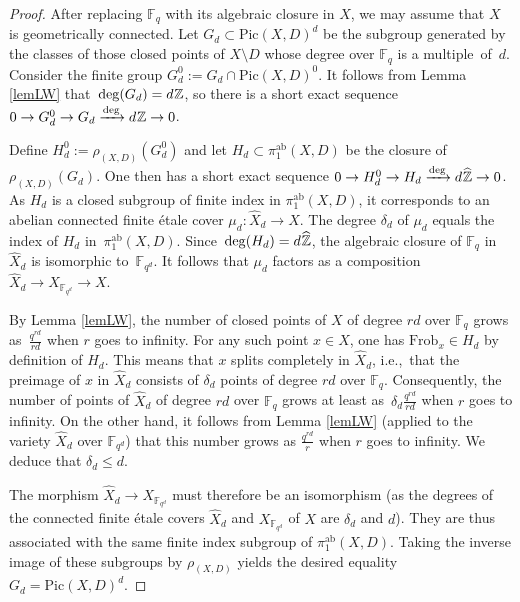 \documentclass[10pt,a4paper]{amsart}
\newcommand{\ie}{i.e.\ }
\def\F{\mathbb F}
\def\Z{\mathbb Z}
\def\ie{i.e.,\ }
\def\whX{\widehat{X}}
\newcommand{\Frob}{\mathrm{Frob}}
\newcommand{\Pic}{\mathrm{Pic}}
\newcommand{\ab}{\mathrm{ab}}
\begin{document}
\begin{proof}
After replacing $\F_q$ with its algebraic closure in $X$, we may assume that $X$ is geometrically connected. Let $G_d\subset \Pic(X,D)^d$ be the subgroup generated by 
the classes of those closed points of $X\setminus D$ whose degree over $\F_q$ is a multiple~of~$d$.
Consider the finite group $G_d^0:=G_d\cap\Pic(X,D)^0$. It follows from Lemma \ref{lemLW} that~$\deg(G_d)=d\mkern 1mu\Z$, so there is a short exact sequence $0\to G_d^0\to G_d\xrightarrow{\deg}d\mkern 1mu\Z\to 0$.

Define $H_d^0:=\rho_{(X,D)}(G_d^0)$ and let $H_d\subset \pi_1^{\ab}(X,D)$ be the closure of $\rho_{(X,D)}(G_d)$. One then has a short exact sequence $0\to H_d^0\to H_d\xrightarrow{\deg}d\mkern 1mu\widehat{\Z}\to 0$. As $H_d$ is a closed subgroup of finite index in $\pi_1^{\ab}(X,D)$, it corresponds to an abelian connected finite \'etale cover $\mu_d:\whX_d\to X$. The degree $\delta_d$ of $\mu_d$ equals the index of $H_d$ in~$\pi_1^{\ab}(X,D)$. Since~$\deg(H_d)=d\mkern 1mu\widehat{\Z}$, the algebraic closure of $\F_q$ in $\whX_d$ is isomorphic to~$\F_{q^d}$.
It follows that $\mu_d$ factors as a composition $\whX_d\to X_{\F_{q^d}}\to X$.

By Lemma \ref{lemLW}, the number of closed points of $X$ of degree $rd$ over $\F_q$ grows as~$\frac{q^{rd}}{rd}$ when $r$ goes to infinity. For any such point $x\in X$, one has $\Frob_x\in H_d$ by definition of $H_d$. This means that $x$ splits completely in $\whX_d$, \ie that the preimage of $x$ in $\whX_d$ consists of $\delta_d$ points of degree $rd$ over $\F_q$. Consequently, the number of points of $\whX_d$ of degree $rd$ over $\F_q$ grows at least as~$\delta_d\frac{q^{rd}}{rd}$ when $r$ goes to infinity. On the other hand, it follows from Lemma \ref{lemLW} (applied to the variety $\whX_d$ over $\F_{q^d}$) that this number grows as $\frac{q^{rd}}{r}$ when $r$ goes to infinity. We deduce that $\delta_d\leq d$.

The morphism $\whX_d\to X_{\F_{q^d}}$
must therefore be an isomorphism (as the degrees of the connected finite \'etale covers 
$\whX_d$ and $X_{\F_{q^d}}$ of $X$ 
are $\delta_d$ and $d$). They are thus associated with the same finite index subgroup of $\pi_1^{\ab}(X,D)$. Taking the inverse image of these subgroups by $\rho_{(X,D)}$ yields the desired equality $G_d=\Pic(X,D)^d$.
\end{proof}
\end{document}
